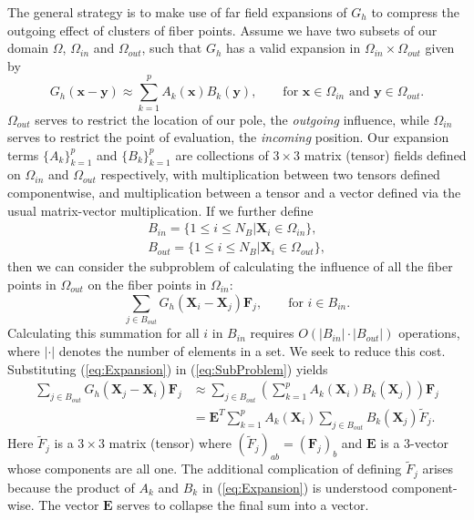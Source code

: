 \documentclass[preprint,12pt]{elsarticle}
\newcommand{\full}{\displaystyle}
\newcommand{\B}[1]{\mathbf{#1}}
\begin{document}
The general strategy is to make use of far field expansions of $G_h$ to compress the outgoing effect of clusters of fiber points. Assume we have two subsets of our domain $\Omega$, $\Omega_{in}$ and $\Omega_{out}$, such that $G_h$ has a valid expansion in $\Omega_{in}\times \Omega_{out}$ given by
\begin{equation}
G_h(\B{x}-\B{y}) \approx \sum_{k=1}^{p}A_k(\B{x})B_k(\B{y}), \qquad \text{for $\B{x}\in\Omega_{in}$ and  $\B{y}\in\Omega_{out}$}.
\label{eq:Expansion}
\end{equation}
$\Omega_{out}$ serves to restrict the location of our pole, the \textit{outgoing} influence, while $\Omega_{in}$ serves to restrict the point of evaluation, the \textit{incoming} position.
Our expansion terms $\{A_k\}_{k=1}^p$ and $\{B_k\}_{k=1}^p$ are collections of $3\times 3$ matrix (tensor) fields defined on $\Omega_{in}$ and $\Omega_{out}$ respectively, with multiplication between two tensors defined componentwise, and multiplication between a tensor and a vector defined via the usual matrix-vector multiplication. If we further define
\begin{gather}
B_{in} = \{1 \leq i \leq N_B | \B{X}_i \in \Omega_{in}\}, \\
B_{out} = \{1 \leq i \leq N_B | \B{X}_i \in \Omega_{out}\},
\end{gather}
then we can consider the subproblem of calculating the influence of all the fiber points in $\Omega_{out}$ on the fiber points in $\Omega_{in}$:
\begin{equation}
\sum_{j\in B_{out}} G_h(\B{X}_i - \B{X}_j) \B{F}_j, \qquad\text{for $i\in B_{in}$}.
\label{eq:SubProblem}
\end{equation}
Calculating this summation for all $i$ in $B_{in}$ requires $O(|B_{in}|\cdot |B_{out}|)$ operations, where $|\cdot|$ denotes the number of elements in a set. We seek to reduce this cost.
Substituting (\ref{eq:Expansion}) in (\ref{eq:SubProblem}) yields
\begin{eqnarray}
\sum_{j\in B_{out}} G_h(\B{X}_j - \B{X}_i) \B{F}_j
&\approx \full\sum_{j\in B_{out}} \left( \sum_{k=1}^{p}A_k(\B{X}_i)B_k(\B{X}_j) \right)  \B{F}_j \nonumber \\
&= \B{E}^T\full\sum_{k=1}^{p}A_k(\B{X}_i) \sum_{j\in B_{out}} B_k(\B{X}_j) \tilde{F}_j.
\label{eq:SummingTrick}
\end{eqnarray}
Here $\tilde{F}_j$ is a $3\times 3$ matrix (tensor) where $(\tilde{F}_j)_{ab}=(\B{F}_j)_b$ and $\B{E}$ is a 3-vector whose components are all one. The additional complication of defining $\tilde{F}_j$ arises because the product of $A_k$ and $B_k$ in (\ref{eq:Expansion}) is understood  component-wise. The vector $\B{E}$ serves to collapse the final sum into a vector.
\end{document}

